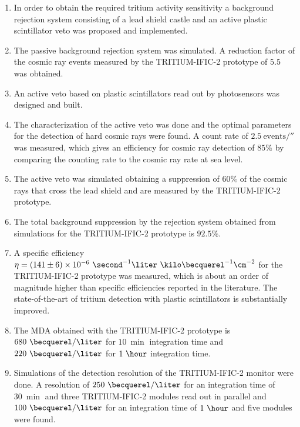 \begin{enumerate}
\item{} In order to obtain the required tritium activity sensitivity a background rejection system consisting of a lead shield castle and an active plastic scintillator veto was proposed and implemented.

\item{} The passive background rejection system was simulated. A reduction factor of the cosmic ray events measured by the TRITIUM-IFIC-2 prototype of $5.5$ was obtained.

\item{} An active veto based on plastic scintillators read out by photosensors was designed and built.

\item{} The characterization of the active veto was done and the optimal parameters for the detection of hard cosmic rays were found. A count rate of $2.5~\text{events}/\second$ was measured, which gives an efficiency for cosmic ray detection of $85\%$ by comparing the counting rate to the cosmic ray rate at sea level.

\item{} The active veto was simulated obtaining a suppression of $60\%$ of the cosmic rays that cross the lead shield and are measured by the TRITIUM-IFIC-2 prototype.

\item{} The total background suppression by the rejection system obtained from simulations for the TRITIUM-IFIC-2 prototype is $92.5\%$.

\item{} A specific efficiency $\eta = (141 \pm 6) \times 10^{-6}~ \second^{-1}  \liter ~ \kilo\becquerel^{-1} \cm^{-2}$ for the TRITIUM-IFIC-2  prototype was measured, which is about an order of magnitude higher than specific efficiencies reported in the literature. The state-of-the-art of tritium detection with plastic scintillators is substantially improved.

\item{} The MDA obtained with the TRITIUM-IFIC-2 prototype is $680~\becquerel/\liter$  for $10~\min$ integration time and $220~\becquerel/\liter$  for $1~\hour$ integration time.

\item{} Simulations of the detection resolution of the TRITIUM-IFIC-2 monitor were done. A resolution of $250~\becquerel/\liter$ for an integration time of $30~\min$ and three TRITIUM-IFIC-2 modules read out in parallel and $100~\becquerel/\liter$ for an integration time of $1~\hour$ and five modules were found.


\end{enumerate}
